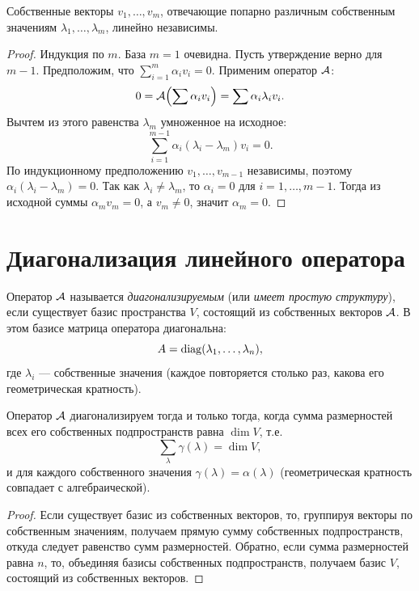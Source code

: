 \documentclass[10pt]{article}
\begin{document}
\begin{theorem}
    Собственные векторы $v_1,\dots,v_m$, отвечающие попарно различным собственным значениям $\lambda_1,\dots,\lambda_m$, линейно независимы.
\end{theorem}
\begin{proof}
    Индукция по $m$. База $m=1$ очевидна. Пусть утверждение верно для $m-1$. Предположим, что $\sum_{i=1}^m \alpha_i v_i = 0$. Применим оператор $\mathcal{A}$:
    \[
    0 = \mathcal{A}\Bigl(\sum \alpha_i v_i\Bigr) = \sum \alpha_i \lambda_i v_i.
    \]
    Вычтем из этого равенства $\lambda_m$ умноженное на исходное:
    \[
    \sum_{i=1}^{m-1} \alpha_i (\lambda_i - \lambda_m) v_i = 0.
    \]
    По индукционному предположению $v_1,\dots,v_{m-1}$ независимы, поэтому $\alpha_i(\lambda_i-\lambda_m)=0$. Так как $\lambda_i\neq\lambda_m$, то $\alpha_i=0$ для $i=1,\dots,m-1$. Тогда из исходной суммы $\alpha_m v_m=0$, а $v_m\neq0$, значит $\alpha_m=0$.
\end{proof}

\section{Диагонализация линейного оператора}

\begin{definition}
    Оператор $\mathcal{A}$ называется \textit{диагонализируемым} (или \textit{имеет простую структуру}), если существует базис пространства $V$, состоящий из собственных векторов $\mathcal{A}$. В этом базисе матрица оператора диагональна:
    \[
    A = \operatorname{diag}(\lambda_1,\dots,\lambda_n),
    \]
    где $\lambda_i$ --- собственные значения (каждое повторяется столько раз, какова его геометрическая кратность).
\end{definition}

\begin{theorem}
    Оператор $\mathcal{A}$ диагонализируем тогда и только тогда, когда сумма размерностей всех его собственных подпространств равна $\dim V$, т.е.
    \[
    \sum_{\lambda} \gamma(\lambda) = \dim V,
    \]
    и для каждого собственного значения $\gamma(\lambda)=\alpha(\lambda)$ (геометрическая кратность совпадает с алгебраической).
\end{theorem}
\begin{proof}
    Если существует базис из собственных векторов, то, группируя векторы по собственным значениям, получаем прямую сумму собственных подпространств, откуда следует равенство сумм размерностей. Обратно, если сумма размерностей равна $n$, то, объединяя базисы собственных подпространств, получаем базис $V$, состоящий из собственных векторов.
\end{proof}
\end{document}
